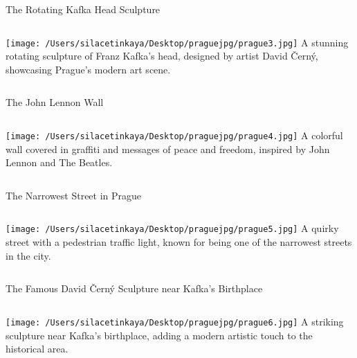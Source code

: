 \documentclass[aspectratio=169]{beamer}
\begin{document}
\begin{frame}{The Rotating Kafka Head Sculpture}
    \begin{columns}
            \texttt{[image: /Users/silacetinkaya/Desktop/praguejpg/prague3.jpg]}
            \textbf{}  
            A stunning rotating sculpture of Franz Kafka's head, designed by artist David Černý, showcasing Prague's modern art scene.
    \end{columns}
\end{frame}

\begin{frame}{The John Lennon Wall}
    \begin{columns}
            \texttt{[image: /Users/silacetinkaya/Desktop/praguejpg/prague4.jpg]}
            \textbf{}  
            A colorful wall covered in graffiti and messages of peace and freedom, inspired by John Lennon and The Beatles.
    \end{columns}
\end{frame}

\begin{frame}{The Narrowest Street in Prague}
    \begin{columns}
            \texttt{[image: /Users/silacetinkaya/Desktop/praguejpg/prague5.jpg]}
            \textbf{}  
             A quirky street with a pedestrian traffic light, known for being one of the narrowest streets in the city.
    \end{columns}
\end{frame}

\begin{frame}{The Famous David Černý Sculpture near Kafka's Birthplace}
    \begin{columns}
            \texttt{[image: /Users/silacetinkaya/Desktop/praguejpg/prague6.jpg]}
            \textbf{}  
             A striking sculpture near Kafka's birthplace, adding a modern artistic touch to the historical area.
    \end{columns}
\end{frame}
\end{document}
